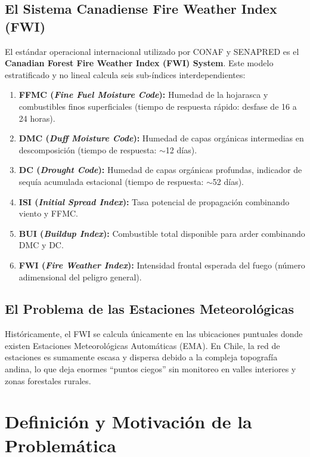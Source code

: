 \documentclass[11pt,a4paper]{article}
\begin{document}
\subsection{El Sistema Canadiense Fire Weather Index (FWI)}
El estándar operacional internacional utilizado por CONAF y SENAPRED es el \textbf{Canadian Forest Fire Weather Index (FWI) System}. Este modelo estratificado y no lineal calcula seis sub-índices interdependientes:
\begin{enumerate}[leftmargin=6mm, itemsep=2pt]
    \item \textbf{FFMC (\textit{Fine Fuel Moisture Code}):} Humedad de la hojarasca y combustibles finos superficiales (tiempo de respuesta rápido: desfase de 16 a 24 horas).
    \item \textbf{DMC (\textit{Duff Moisture Code}):} Humedad de capas orgánicas intermedias en descomposición (tiempo de respuesta: $\sim$12 días).
    \item \textbf{DC (\textit{Drought Code}):} Humedad de capas orgánicas profundas, indicador de sequía acumulada estacional (tiempo de respuesta: $\sim$52 días).
    \item \textbf{ISI (\textit{Initial Spread Index}):} Tasa potencial de propagación combinando viento y FFMC.
    \item \textbf{BUI (\textit{Buildup Index}):} Combustible total disponible para arder combinando DMC y DC.
    \item \textbf{FWI (\textit{Fire Weather Index}):} Intensidad frontal esperada del fuego (número adimensional del peligro general).
\end{enumerate}

\subsection{El Problema de las Estaciones Meteorológicas}
Históricamente, el FWI se calcula únicamente en las ubicaciones puntuales donde existen Estaciones Meteorológicas Automáticas (EMA). En Chile, la red de estaciones es sumamente escasa y dispersa debido a la compleja topografía andina, lo que deja enormes ``puntos ciegos'' sin monitoreo en valles interiores y zonas forestales rurales.

\section{Definición y Motivación de la Problemática}
\end{document}
